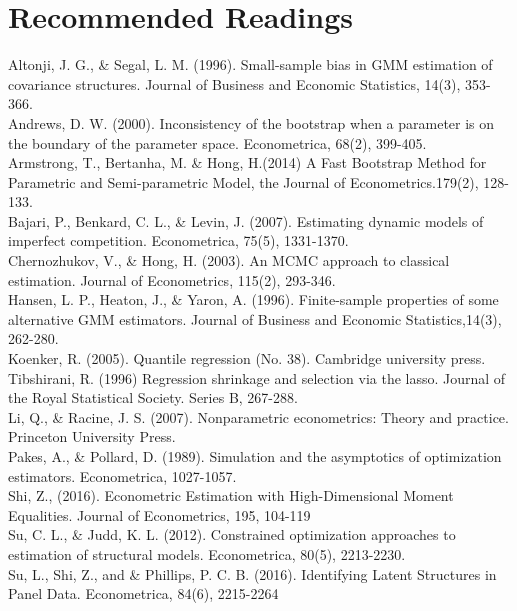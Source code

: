\documentclass[11pt]{article}
\begin{document}
\section{Recommended Readings}
Altonji, J. G., \& Segal, L. M. (1996). Small-sample bias in GMM estimation of covariance structures. Journal of Business and Economic Statistics, 14(3), 353-366. \\
Andrews, D. W. (2000). Inconsistency of the bootstrap when a parameter is on the boundary of the parameter space. Econometrica, 68(2), 399-405. \\
Armstrong, T., Bertanha, M. \& Hong, H.(2014) A Fast Bootstrap Method for Parametric and Semi-parametric Model, the Journal of Econometrics.179(2), 128-133. \\
Bajari, P., Benkard, C. L., \& Levin, J. (2007). Estimating dynamic models of imperfect competition. Econometrica, 75(5), 1331-1370. \\
Chernozhukov, V., \& Hong, H. (2003). An MCMC approach to classical estimation. Journal of Econometrics, 115(2), 293-346. \\
Hansen, L. P., Heaton, J., \& Yaron, A. (1996). Finite-sample properties of some alternative GMM estimators. Journal of Business and Economic Statistics,14(3), 262-280. \\
Koenker, R. (2005). Quantile regression (No. 38). Cambridge university press. \\
Tibshirani, R. (1996) Regression shrinkage and selection via the lasso. Journal of the Royal Statistical Society. Series B, 267-288. \\
Li, Q., \& Racine, J. S. (2007). Nonparametric econometrics: Theory and practice. Princeton University Press. \\
Pakes, A., \& Pollard, D. (1989). Simulation and the asymptotics of optimization estimators. Econometrica, 1027-1057. \\
Shi, Z., (2016). Econometric Estimation with High-Dimensional Moment Equalities. Journal of Econometrics, 195, 104-119 \\
Su, C. L., \& Judd, K. L. (2012). Constrained optimization approaches to estimation of structural models. Econometrica, 80(5), 2213-2230.\\
Su, L., Shi, Z., and \& Phillips, P. C. B. (2016). Identifying Latent Structures in Panel Data. Econometrica, 84(6), 2215-2264
\end{document}
